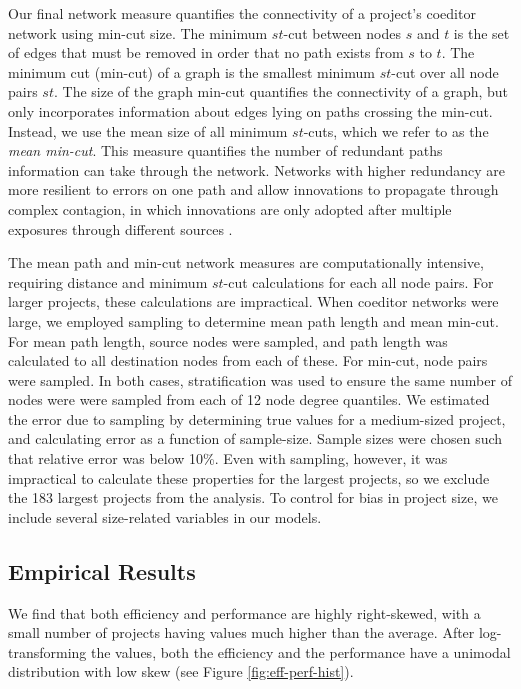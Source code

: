 Our final network measure quantifies the connectivity of a project's coeditor network using
min-cut size.
The minimum $st$-cut between nodes $s$ and $t$ is the set of edges that must be removed in order that
no path exists from $s$ to $t$.
The minimum cut (min-cut) of a graph is the smallest minimum $st$-cut over all node pairs $st$. 
The size of the graph min-cut quantifies the connectivity of a graph,
but only incorporates information about edges lying on paths crossing the min-cut.
Instead, we use the mean size of all minimum $st$-cuts, which we refer to as the
{\em mean min-cut}.
This measure quantifies the number of redundant paths information can take through the network.
Networks with higher redundancy are more resilient to errors on one path \cite{albert_error_2000}
and allow innovations to propagate through complex contagion,
in which innovations are only adopted after multiple exposures through different sources
\cite{centola_complex_2007}.

The mean path and min-cut network measures are computationally intensive,
requiring distance and minimum $st$-cut calculations for each all node pairs.
For larger projects, these calculations are impractical.
When coeditor networks were large, we employed sampling to determine mean path length and mean
min-cut.
For mean path length, source nodes were sampled, and path length was calculated to all destination nodes
from each of these.
For min-cut, node pairs were sampled.
In both cases, stratification was used to ensure the same number of nodes were were sampled from each of
12 node degree quantiles.
We estimated the error due to sampling by determining true values for a medium-sized project,
and calculating error as a function of sample-size.
Sample sizes were chosen such that relative error was below 10\%.
Even with sampling, however, it was impractical to calculate these properties for the largest projects,
so we exclude the 183 largest projects from the analysis.
To control for bias in project size, we include several size-related variables in our models.

\subsection{Empirical Results}

We find that both efficiency and performance are highly right-skewed,
with a small number of projects having values much higher than the average.
After log-transforming the values, both the efficiency and the performance have
a unimodal distribution with low skew (see Figure \ref{fig:eff-perf-hist}).

